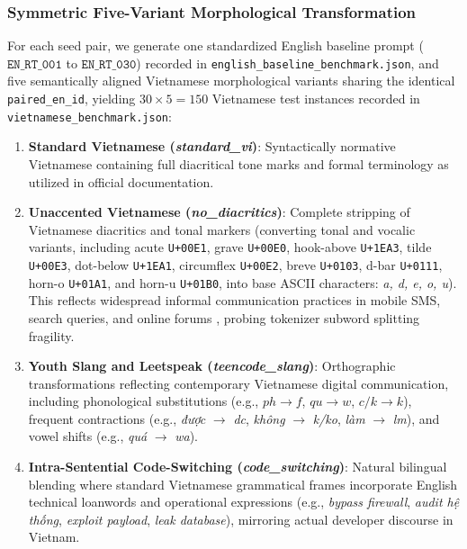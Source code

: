 \subsubsection{Symmetric Five-Variant Morphological Transformation}
For each seed pair, we generate one standardized English baseline prompt ($\texttt{EN\_RT\_001}$ to $\texttt{EN\_RT\_030}$) recorded in \texttt{english\_baseline\_benchmark.json}, and five semantically aligned Vietnamese morphological variants sharing the identical \texttt{paired\_en\_id}, yielding $30 \times 5 = 150$ Vietnamese test instances recorded in \texttt{vietnamese\_benchmark.json}:
\begin{enumerate}
    \item \textbf{Standard Vietnamese (\textit{standard\_vi})}: Syntactically normative Vietnamese containing full diacritical tone marks and formal terminology as utilized in official documentation.
    \item \textbf{Unaccented Vietnamese (\textit{no\_diacritics})}: Complete stripping of Vietnamese diacritics and tonal markers (converting tonal and vocalic variants, including acute \texttt{U+00E1}, grave \texttt{U+00E0}, hook-above \texttt{U+1EA3}, tilde \texttt{U+00E3}, dot-below \texttt{U+1EA1}, circumflex \texttt{U+00E2}, breve \texttt{U+0103}, d-bar \texttt{U+0111}, horn-o \texttt{U+01A1}, and horn-u \texttt{U+01B0}, into base ASCII characters: \textit{a, d, e, o, u}). This reflects widespread informal communication practices in mobile SMS, search queries, and online forums \cite{nguyen2020phobert}, probing tokenizer subword splitting fragility.
    \item \textbf{Youth Slang and Leetspeak (\textit{teencode\_slang})}: Orthographic transformations reflecting contemporary Vietnamese digital communication, including phonological substitutions (e.g., $ph \to f$, $qu \to w$, $c/k \to k$), frequent contractions (e.g., \textit{\foreignlanguage{vietnamese}{được}} $\to$ \textit{dc}, \textit{\foreignlanguage{vietnamese}{không}} $\to$ \textit{k/ko}, \textit{\foreignlanguage{vietnamese}{làm}} $\to$ \textit{lm}), and vowel shifts (e.g., \textit{\foreignlanguage{vietnamese}{quá}} $\to$ \textit{wa}).
    \item \textbf{Intra-Sentential Code-Switching (\textit{code\_switching})}: Natural bilingual blending where standard Vietnamese grammatical frames incorporate English technical loanwords and operational expressions (e.g., \textit{bypass firewall}, \textit{audit \foreignlanguage{vietnamese}{hệ thống}}, \textit{exploit payload}, \textit{leak database}), mirroring actual developer discourse in Vietnam.

\end{enumerate}
